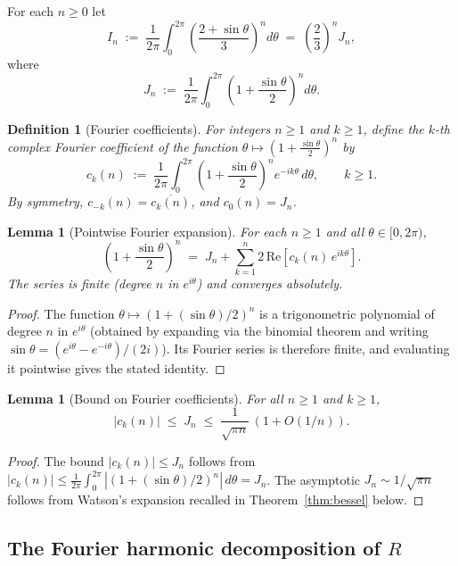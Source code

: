 \documentclass[12pt]{amsart}
\newtheorem{lemma}[theorem]{Lemma}
\newtheorem{definition}[theorem]{Definition}
\begin{document}
For each $n\ge 0$ let
\[
  I_n \;:=\; \frac{1}{2\pi}\int_{0}^{2\pi}
               \!\left(\frac{2+\sin\theta}{3}\right)^{\!n}d\theta
        \;=\; \left(\frac{2}{3}\right)^{\!n} J_n,
\]
where
\[
  J_n \;:=\; \frac{1}{2\pi}\int_{0}^{2\pi}
              \!\left(1+\frac{\sin\theta}{2}\right)^{\!n}d\theta.
\]

\begin{definition}[Fourier coefficients]\label{def:Fourier-coeff}
For integers $n\ge 1$ and $k\ge 1$, define the $k$-th complex Fourier
coefficient of the function $\theta\mapsto(1+\tfrac{\sin\theta}{2})^n$
by
\[
  c_k(n) \;:=\; \frac{1}{2\pi}\int_{0}^{2\pi}
                 \!\left(1+\frac{\sin\theta}{2}\right)^{\!n}
                 e^{-ik\theta}\,d\theta,
  \qquad k\ge 1.
\]
By symmetry, $c_{-k}(n)=\overline{c_k(n)}$, and $c_0(n)=J_n$.
\end{definition}

\begin{lemma}[Pointwise Fourier expansion]\label{lem:Fourier-pw}
For each $n\ge 1$ and all $\theta\in[0,2\pi)$,
\[
  \left(1+\frac{\sin\theta}{2}\right)^{\!n}
  \;=\; J_n + \sum_{k=1}^{n}
        2\,\mathrm{Re}\!\left[c_k(n)\,e^{ik\theta}\right].
\]
The series is finite (degree $n$ in $e^{i\theta}$) and converges
absolutely.
\end{lemma}

\begin{proof}
The function $\theta\mapsto(1+(\sin\theta)/2)^n$ is a trigonometric
polynomial of degree $n$ in $e^{i\theta}$ (obtained by expanding via
the binomial theorem and writing $\sin\theta=(e^{i\theta}-e^{-i\theta})/(2i)$).
Its Fourier series is therefore finite, and evaluating it pointwise
gives the stated identity.
\end{proof}

\begin{lemma}[Bound on Fourier coefficients]\label{lem:Fk-bound}
For all $n\ge 1$ and $k\ge 1$,
\[
  |c_k(n)| \;\le\; J_n \;\le\; \frac{1}{\sqrt{\pi n}}\,(1+O(1/n)).
\]
\end{lemma}

\begin{proof}
The bound $|c_k(n)|\le J_n$ follows from
$|c_k(n)|\le\frac{1}{2\pi}\int_0^{2\pi}|(1+(\sin\theta)/2)^n|\,d\theta=J_n$.
The asymptotic $J_n\sim 1/\sqrt{\pi n}$ follows from
Watson's expansion recalled in Theorem~\ref{thm:bessel} below.
\end{proof}

\subsection{The Fourier harmonic decomposition of $R$}
\end{document}
